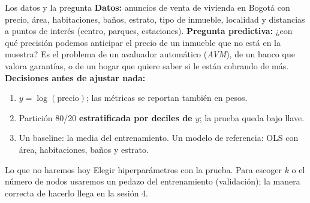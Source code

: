 \documentclass{beamer}
\newcommand{\1}{\mathbb{I}}
\begin{document}
\begin{frame}{Los datos y la pregunta}
\small
\textbf{Datos:} anuncios de venta de vivienda en Bogotá con precio, área, habitaciones, baños, estrato, tipo de inmueble, localidad y distancias a puntos de interés (centro, parques, estaciones).
\pause
\vspace{0.15cm}
\textbf{Pregunta predictiva:} ¿con qué precisión podemos anticipar el precio de un inmueble que no está en la muestra? Es el problema de un avaluador automático (\emph{AVM}), de un banco que valora garantías, o de un hogar que quiere saber si le están cobrando de más.
\pause
\vspace{0.15cm}
\textbf{Decisiones antes de ajustar nada:}
\begin{enumerate}\itemsep3pt
  \item $y = \log(\text{precio})$; las métricas se reportan también en pesos.
  \item Partición 80/20 \textbf{estratificada por deciles de $y$}; la prueba queda bajo llave.
  \item Un baseline: la media del entrenamiento. Un modelo de referencia: OLS con área, habitaciones, baños y estrato.
\end{enumerate}
\pause
\begin{block}{Lo que no haremos hoy}
Elegir hiperparámetros con la prueba. Para escoger $k$ o el número de nodos usaremos un pedazo del entrenamiento (validación); la manera correcta de hacerlo llega en la sesión 4.
\end{block}
\end{frame}
\end{document}
